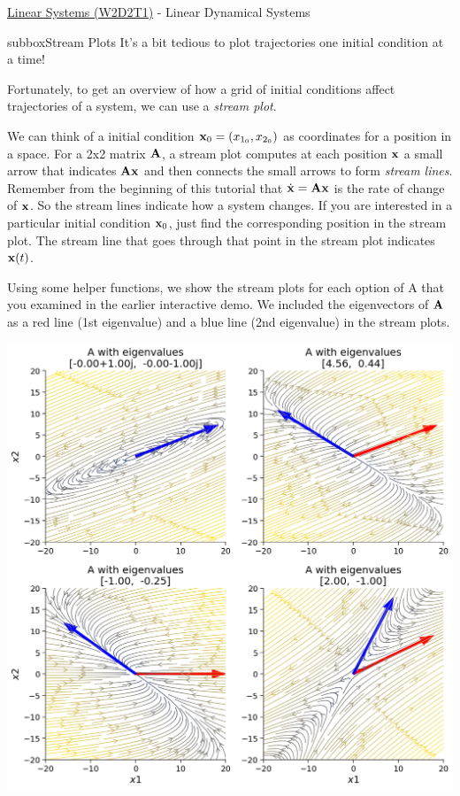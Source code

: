 \begin{textbox}{\href{https://compneuro.neuromatch.io/tutorials/W2D2_LinearSystems/student/W2D2_Tutorial1.html}{Linear Systems (W2D2T1)} -  Linear Dynamical Systems}
\begin{subbox}{subbox}{Stream Plots}
\scriptsize
It's a bit tedious to plot trajectories one initial condition at a time!

Fortunately, to get an overview of how a grid of initial conditions affect trajectories of a system, we can use a \textit{stream plot}. 

We can think of a initial condition ${\bf x}_0=(x_{1_0},x_{2_0})$  as coordinates for a position in a space. For a 2x2 matrix $\bf A$, a stream plot computes at each position $\bf x$ a small arrow that indicates $\bf Ax$ and then connects the small arrows to form \textit{stream lines}. Remember from the beginning of this tutorial that $\dot {\bf x} = \bf Ax$ is the rate of change of $\bf x$. So the stream lines indicate how a system changes. If you are interested in a particular initial condition ${\bf x}_0$, just find the corresponding position in the stream plot. The stream line that goes through that point in the stream plot indicates ${\bf x}(t)$.

Using some helper functions, we show the stream plots for each option of A that you examined in the earlier interactive demo. We included the eigenvectors of $\bf A$ as a red line (1st eigenvalue) and a blue line (2nd eigenvalue) in the stream plots.

\centering
\includegraphics[scale=0.12]{Figures/LS/LSFigure3.png}
\end{subbox}
\end{textbox}
